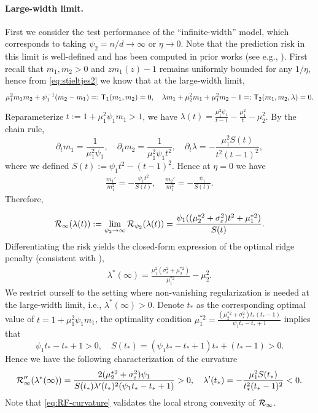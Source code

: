 \documentclass{article} %
\begin{document}
\paragraph{Large-width limit.} First we consider the test performance of the ``infinite-width'' model, which corresponds to taking $\psi_2=n/d\to\infty$ or $\eta\to 0$. Note that the prediction risk in this limit is well-defined and has been computed in prior works (see e.g., \cite{bartlett2021deep}). First recall that $m_1,m_2>0$ and $z m_1(z)-1$ remains uniformly bounded for any $1/\eta$, hence from \eqref{eq:stieltjes2} we know that at the large-width limit, 
\begin{align*}
    \mu_1^2 m_1m_2 + \psi_1^{-1} (m_2-m_1) =:{\mathsf T}_1(m_1,m_2) = 0, \quad \lambda m_1 + \mu_2^2 m_1 + \mu_1^2 m_2 - 1 =: {\mathsf T}_2(m_1,m_2,\lambda) = 0. 
\end{align*}
Reparameterize $t:= 1+\mu_1^2\psi_1 m_1>1$, we have $\lambda(t) = \frac{\mu_1^2\psi_1}{t-1} - \frac{\mu_1^2}{t} - \mu_2^2$. 
By the chain rule, 
\[
\partial_t m_1 = \frac{1}{\mu_1^2\psi_1}, \quad
\partial_t m_2 = \frac{1}{\mu_1^2\psi_1t^2}, \quad
\partial_t \lambda = -\frac{\mu_1^2S(t)}{t^2(t-1)^2}, 
\]
where we defined $S(t) := \psi_1t^2 - (t-1)^2$. Hence at $\eta=0$ we have
\begin{align*}
    \frac{m_1'}{m_1^2} = -\frac{\psi_1 t^2}{S(t)},\quad
    \frac{m_2'}{m_1^2} = -\frac{\psi_1}{S(t)}.
\end{align*}
Therefore, 

\[
{\mathcal R}_\infty(\lambda(t)):=\lim_{\psi_2\to\infty}{\mathcal R}_{\psi_2}(\lambda(t)) = \frac{\psi_1 ((\mu_2^{*2} + \sigma_\varepsilon^2) t^2 + \mu_1^{*2})}{S(t)}. 
\]
Differentiating the risk yields the closed-form expression of the optimal ridge penalty (consistent with \cite{dobriban2018high,wu2020optimal}), 
\begin{align}
\lambda^*(\infty) =  \frac{\mu_1^2(\sigma_{\varepsilon}^2+\mu_2^{*2})}{\mu_1^{*2}} - \mu_2^2. \label{eq:optimal-lambda}
\end{align}
We restrict ourself to the setting where non-vanishing regularization is needed at the large-width limit, i.e., $\lambda^*(\infty)>0$. 
Denote $t_*$ as the corresponding optimal value of $t=1+\mu_1^2\psi_1m_1$, the optimality condition $\mu_1^{*2} = \frac{(\mu_2^{*2} + \sigma_\varepsilon^2) t_*(t_*-1)}{\psi_1t_*-t_*+1}$ implies that
\[
\psi_1t_*-t_*+1>0, \quad S(t_*) = (\psi_1t_*-t_*+1) t_* + (t_*-1) > 0.
\]
Hence we have the following characterization of the curvature
\begin{align}
{\mathcal R}_\infty''(\lambda^*(\infty)) = \frac{2(\mu_2^{*2} + \sigma_\varepsilon^2)\psi_1}{S(t_*) \lambda'(t_*)^2 (\psi_1 t_*-t_*+1)} > 0, 
\quad
\lambda'(t_*) = -\frac{\mu_1^2S(t_*)}{t_*^2(t_*-1)^2} < 0. 
\label{eq:RF-curvature}
\end{align}
Note that \eqref{eq:RF-curvature} validates the local strong convexity of ${\mathcal R}_\infty$. 
\end{document}
